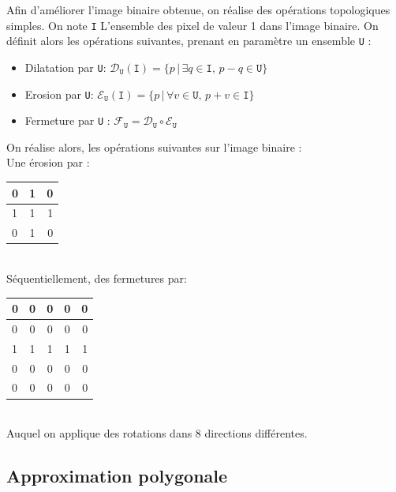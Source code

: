 \documentclass{article}
\begin{document}
\begin{multicols}{2}
Afin d'améliorer l'image binaire obtenue, on réalise des opérations topologiques simples. On note \texttt{I} L'ensemble des pixel de valeur 1 dans l'image binaire. On définit alors les opérations suivantes, prenant en paramètre un ensemble \texttt{U} :
\begin{itemize}
	\item Dilatation par \texttt{U}: $\mathcal{D}_\mathtt{U}(\mathtt{I}) = \{p \, | \, \exists q \in \mathtt{I}, \, {p-q} \in \mathtt{U}\}$
	\item Erosion par \texttt{U}: $\mathcal{E}_\mathtt{U}(\mathtt{I}) = \{p \, | \, \forall v \in \mathtt{U}, \, {p+v} \in \mathtt{I}\}$
	\item Fermeture par \texttt{U} : $\mathcal{F}_\mathtt{U} = \mathcal{D}_\mathtt{U} \circ \mathcal{E}_\mathtt{U}$
\end{itemize}
On réalise alors, les opérations suivantes sur l'image binaire :\\
Une érosion par :\\
\medskip
\begin{tabular}{|l|c|r|}
	\hline
	0 & 1 & 0 \\ \hline
	1 & 1 & 1 \\ \hline
	0 & 1 & 0 \\
	\hline
\end{tabular}\\
\medskip
Séquentiellement, des fermetures par:\\
\medskip
\begin{tabular}{|l|c|c|c|r|}
	\hline
	0 & 0 & 0 & 0 & 0 \\ \hline
	0 & 0 & 0 & 0 & 0 \\ \hline
	1 & 1 & 1 & 1 & 1 \\ \hline
	0 & 0 & 0 & 0 & 0 \\ \hline
	0 & 0 & 0 & 0 & 0 \\
	\hline
\end{tabular}\\
\medskip
Auquel on applique des rotations dans 8 directions différentes.

\subsection{Approximation polygonale}


\end{multicols}
\end{document}
